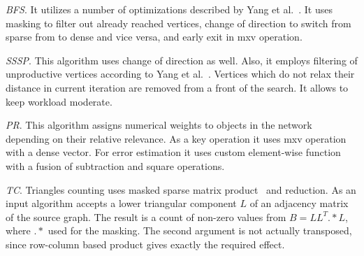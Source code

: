 \textit{BFS}. It utilizes a number of optimizations described by Yang et al.~\cite{https://doi.org/10.48550/arxiv.1804.03327:pushpull}. It uses masking to filter out already reached vertices, change of direction to switch from sparse from to dense and vice versa, and early exit in mxv operation.

\textit{SSSP}. This algorithm uses change of direction as well. Also, it employs filtering of unproductive vertices according to Yang et al.~\cite{yang2019graphblast}. Vertices which do not relax their distance in current iteration are removed from a front of the search. It allows to keep workload moderate. 

\textit{PR}. This algorithm assigns numerical weights to objects in the network depending on their relative relevance. As a key operation it uses mxv operation with a dense vector. For error estimation it uses custom element-wise function with a fusion of subtraction and square operations.  

\textit{TC}. Triangles counting uses masked sparse matrix product~\cite{yang2019graphblast} and reduction. As an input algorithm accepts a lower triangular component $L$ of an adjacency matrix of the source graph. The result is a count of non-zero values from $B = LL^T .* L$, where $.*$ used for the masking. The second argument is not actually transposed, since row-column based product gives exactly the required effect.